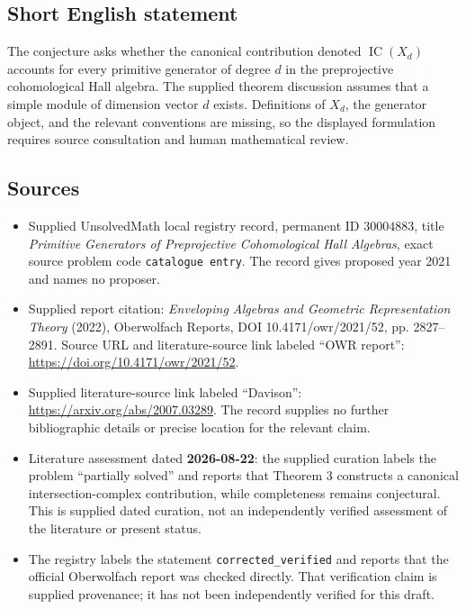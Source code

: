 \documentclass[11pt]{article}
\begin{document}
\subsection{Short English statement}
The conjecture asks whether the canonical contribution denoted \(\operatorname{IC}(X_d)\) accounts for every primitive generator of degree \(d\) in the preprojective cohomological Hall algebra. The supplied theorem discussion assumes that a simple module of dimension vector \(d\) exists. Definitions of \(X_d\), the generator object, and the relevant conventions are missing, so the displayed formulation requires source consultation and human mathematical review.
\subsection{Sources}
\begin{itemize}
\item Supplied UnsolvedMath local registry record, permanent ID \(30004883\), title \emph{Primitive Generators of Preprojective Cohomological Hall Algebras}, exact source problem code \texttt{catalogue entry}. The record gives proposed year 2021 and names no proposer.
\item Supplied report citation: \emph{Enveloping Algebras and Geometric Representation Theory} (2022), Oberwolfach Reports, DOI 10.4171/owr/2021/52, pp. 2827--2891. Source URL and literature-source link labeled ``OWR report'': \url{https://doi.org/10.4171/owr/2021/52}.
\item Supplied literature-source link labeled ``Davison'': \url{https://arxiv.org/abs/2007.03289}. The record supplies no further bibliographic details or precise location for the relevant claim.
\item Literature assessment dated \textbf{2026-08-22}: the supplied curation labels the problem ``partially solved'' and reports that Theorem 3 constructs a canonical intersection-complex contribution, while completeness remains conjectural. This is supplied dated curation, not an independently verified assessment of the literature or present status.
\item The registry labels the statement \texttt{corrected\_verified} and reports that the official Oberwolfach report was checked directly. That verification claim is supplied provenance; it has not been independently verified for this draft.
\end{itemize}
\end{document}
